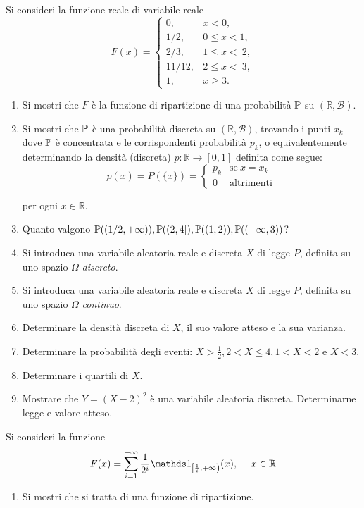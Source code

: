 Si consideri la funzione reale di variabile reale
\begin{equation*}
F( x) =\begin{cases}
0, & x< 0,\\
1/2, & 0\leq x< 1,\\
2/3, & 1\leq x< \ 2,\\
11/12, & 2\leq x< \ 3,\\
1, & x\geq 3.
\end{cases}
\end{equation*}
\begin{enumerate}
\item Si mostri che $F$ è la funzione di ripartizione di una probabilità $\mathbb{P}$ su $(\mathbb{R} ,\mathcal{B})$.
\item Si mostri che $\mathbb{P}$ è una probabilità discreta su $(\mathbb{R} ,\mathcal{B})$, trovando i punti $x_{k}$ dove $\mathbb{P}$ è concentrata e le corrispondenti probabilità $p_{k}$, o equivalentemente determinando la densità (discreta) $p:\mathbb{R}\rightarrow [ 0,1]$ definita come segue:\begin{equation*}
p( x) =P(\{x\}) =\begin{cases}
p_{k} & \text{se} \ x=x_{k}\\
0 & \text{altrimenti}
\end{cases}
\end{equation*}

per ogni $x\in \mathbb{R}$.
\item Quanto valgono $\mathbb{P}(( 1/2,+\infty )) ,\mathbb{P}(( 2,4]) ,\mathbb{P}(( 1,2)) ,\mathbb{P}(( -\infty ,3))$?
\item Si introduca una variabile aleatoria reale e discreta $X$ di legge $P$, definita su uno spazio $\Omega $ \textit{discreto}.
\item Si introduca una variabile aleatoria reale e discreta $X$ di legge $P$, definita su uno spazio $\Omega $ \textit{continuo}.
\item Determinare la densità discreta di $X$, il suo valore atteso e la sua varianza.
\item Determinare la probabilità degli eventi: $X >\frac{1}{2} ,2< X\leq 4,1< X< 2$ e $X< 3$.
\item Determinare i quartili di $X$.
\item Mostrare che $Y=( X-2)^{2}$ è una variabile aleatoria discreta. Determinarne legge e valore atteso.
\end{enumerate}
\Esercizio{}

Si consideri la funzione
\begin{equation*}
F( x) =\sum\limits _{i=1}^{+\infty }\frac{1}{2^{i}}\Ind_{\left[\frac{1}{i} ,+\infty \right)}( x) ,\ \ \ \ x\in \mathbb{R}
\end{equation*}
\begin{enumerate}
\item Si mostri che si tratta di una funzione di ripartizione.
\end{enumerate}

